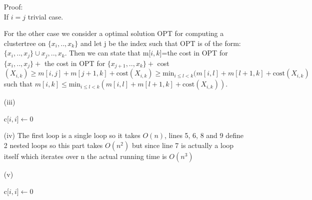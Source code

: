 \documentclass{article}
\newcounter{rcounter}
\newenvironment{rlist}%
{\begin{list}{A.2-\arabic{rcounter}}{\usecounter{rcounter}}}{\end{list}}
\newcounter{rcountermem}
\begin{document}
\begin{rlist}
\begin{enumerate}
Proof:\\
If $i=j$ trivial case.

For the other case we consider a optimal solution OPT for computing a clustertree on $\{x_i,..,x_k\}$ and let j be the index such that OPT is of the form: $\{x_i,..,x_j\} \cup {x_j,..,x_k}$. Then we can state that m[$i,k$]=the cost in OPT for $\{x_i,..,x_j\} + $ the cost in OPT for $\{x_{j+1},..,x_k\} +$ cost$(X_{i,k}) \ge m[i,j]+m[j+1,k]+\text{cost}(X_{i,k}) \ge \text{min}_{i\le l < k}(m[i,l]+m[l+1,k]+\text{cost}(X_{i,k})$ such that $m[i,k]\le \text{min}_{i\le l < k}(m[i,l]+m[l+1,k]+\text{cost}(X_{i,k}))$.
      \item[(iii)]

\begin{algorithmic}[1]
\STATE c[$i,i] \gets 0$
\ENDFOR
{}
\STATE{$c[i,j] \gets \text{min}_{i\le k<j}(c[i,k],c[k+1,j)+\text{Cost}[i,j]$}
\ENDFOR
\ENDFOR
{}
\end{algorithmic}



      \item[(iv)] The first loop is a single loop so it takes $O(n)$, lines 5, 6, 8 and 9 define 2 nested loops so this part takes $O(n^2)$ but since line 7 is actually a loop itself which iterates over n the actual running time is $O(n^3)$
      \item[(v)] 
\begin{algorithmic}[1]
\STATE c[$i,i] \gets 0$
\ENDFOR
{}
\STATE{$c \gets\text{min}_{i\le k<j}(c[i,k],c[k+1,j)+\text{Cost}[i,j]$}
\ENDIF
\ENDFOR
\ENDFOR
\ENDFOR
{}
\end{algorithmic}
\bigskip
\begin{algorithmic}[1]
\ELSE
{}
\ENDIF
\end{algorithmic}
      \end{enumerate}
\setcounter{rcountermem}{\value{rcounter}}
\end{rlist}
\end{document}

